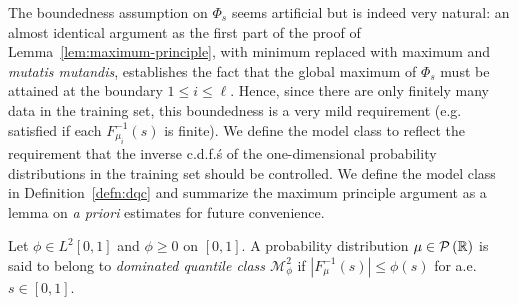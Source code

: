 \documentclass[letterpaper]{article} %
\begin{document}

The boundedness assumption on $\Phi_s$ seems artificial but is indeed very natural: an almost identical argument as the first part of the proof of Lemma~\ref{lem:maximum-principle}, with minimum replaced with maximum and \emph{mutatis mutandis}, establishes the fact that the global maximum of $\Phi_s$ must be attained at the boundary $1\leq i\leq \ell$.  Hence, since there are only finitely many data in the training set, this boundedness is a very mild requirement (e.g. satisfied if each $F_{\mu_i}^{-1} \left( s \right)$ is finite). We define the model class to reflect the requirement that the inverse c.d.f.\'s of the one-dimensional probability distributions in the training set should be controlled. We define the model class in Definition~\ref{defn:dqc} and summarize the maximum principle argument as a lemma on \emph{a priori} estimates for future convenience. 

\begin{definition}
\label{defn:dqc}
  Let $\phi\in L^2 \left[ 0,1 \right]$ and $\phi\geq 0$ on $\left[ 0,1 \right]$. A probability distribution $\mu\in\P\left( \mathbb{R} \right)$ is said to belong to \emph{dominated quantile class $\mathcal{M}_{\phi}^2$} if $\left|F_{\mu}^{-1}\left( s \right)\right|\leq \phi \left( s \right)$ for a.e. $s\in \left[0,1\right]$.
\end{definition}
\end{document}
